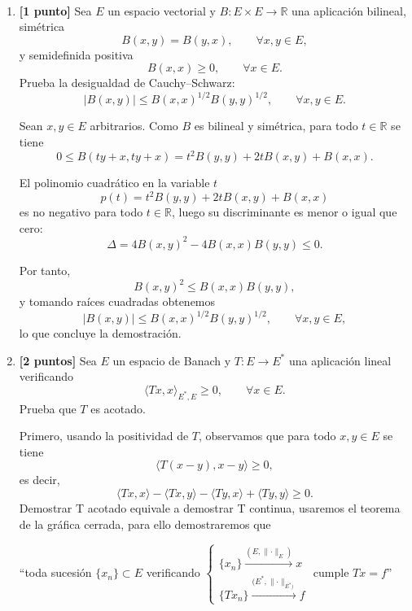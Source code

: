 \documentclass[12pt]{article}
\newcommand{\norma}[1]{\lVert #1 \rVert}
\begin{document}
    \begin{ejercicio}[5 puntos]~
    \begin{enumerate}
    \item \textbf{[1 punto]}  
    Sea $E$ un espacio vectorial y $B : E \times E \to \mathbb{R}$ una aplicación bilineal,
    simétrica
    \[
    B(x,y)=B(y,x), \qquad \forall x,y\in E,
    \]
    y semidefinida positiva
    \[
    B(x,x)\ge 0, \qquad \forall x\in E.
    \]
    Prueba la desigualdad de Cauchy--Schwarz:
    \[
    |B(x,y)| \le B(x,x)^{1/2} B(y,y)^{1/2},
    \qquad \forall x,y\in E.
    \]

    Sean $x,y\in E$ arbitrarios. Como $B$ es bilineal y simétrica, para todo $t\in\mathbb{R}$ se tiene
    \[
    0 \le B(ty+x,ty+x)
    = t^2 B(y,y) + 2t B(x,y) + B(x,x).
    \]
    
    El polinomio cuadrático en la variable $t$
    \[
    p(t)=t^2 B(y,y)+2tB(x,y)+B(x,x)
    \]
    es no negativo para todo $t\in\mathbb{R}$, luego su discriminante es menor o igual que cero:
    \[
    \Delta = 4B(x,y)^2 - 4B(x,x)B(y,y) \le 0.
    \]
    
    Por tanto,
    \[
    B(x,y)^2 \le B(x,x)B(y,y),
    \]
    y tomando raíces cuadradas obtenemos
    \[
    |B(x,y)| \le B(x,x)^{1/2} B(y,y)^{1/2},
    \qquad \forall x,y\in E,
    \]
    lo que concluye la demostración.

    
    \item \textbf{[2 puntos]}  
    Sea $E$ un espacio de Banach y $T : E \to E^\ast$ una aplicación lineal verificando
    \[
    \langle Tx,x\rangle_{E^\ast,E} \ge 0,
    \qquad \forall x\in E.
    \]
    Prueba que $T$ es acotado.

    Primero, usando la positividad de $T$, observamos que para todo $x,y\in E$ se tiene
    \[
    \langle T(x-y),x-y\rangle \ge 0,
    \]
    es decir,
    \[
    \langle Tx,x\rangle - \langle Tx,y\rangle - \langle Ty,x\rangle + \langle Ty,y\rangle \ge 0.
    \tag{1}
    \]
    Demostrar T acotado equivale a demostrar T continua, usaremos el teorema de la gráfica cerrada, para ello demostraremos que
    \begin{center}
        ``toda sucesión $\{x_n\}\subset E$ verificando $
            \left\{\begin{array}{l}
                \{x_n\} \stackrel{(E,\norma{\cdot}_E)}{\longrightarrow} x \\
                \{Tx_n\} \stackrel{(E^\ast,\norma{\cdot}_{E^\ast)}}{\longrightarrow} f
            \end{array}\right.$ cumple $Tx=f$''
    \end{center}


\end{enumerate}
\end{ejercicio}
\end{document}
